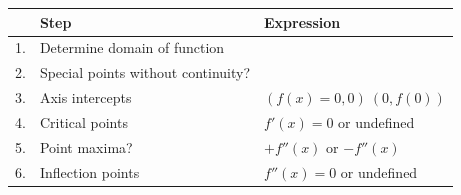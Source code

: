 \documentclass{article}
\begin{document}
\begin{table}[H]
    \begin{tabular}{rll}
            & Step                                 & Expression                                                                                                                                                                                                                                                                              \\ \hline
        1.  & Determine domain of function         &                                                                                                                                                                                                                                                                                         \\
        2.  & Special points without continuity?   &                                                                                                                                                                                                                                                                                         \\
        3.  & Axis intercepts                      & $(f(x)=0, 0)\ (0, f(0))$                                                                                                                                                                                                                                                                \\
        4.  & Critical points                      & $f'(x)=0$ or undefined                                                                                                                                                                                                                                                                  \\
        5.  & Point maxima?                        & $+f''(x)$ or $-f''(x)$                                                                                                                                                                                                                                                                  \\
        6.  & Inflection points                    & $f''(x)=0$ or undefined                                                                                                                                                                                                                                                                 \\

\end{tabular}
\end{table}
\end{document}
